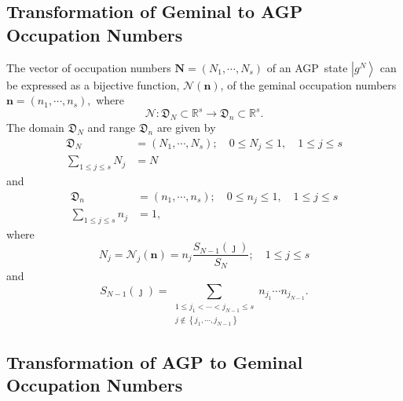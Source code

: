 \documentclass[aps,preprint]{revtex4}%
\begin{document}
\subsection{Transformation of Geminal to AGP Occupation Numbers}

The vector of occupation numbers $\mathbf{N}=\left(  N_{1},\cdots
,N_{s}\right)  $ of an AGP\ state $\left\vert g^{N}\right\rangle $ can be
expressed as a bijective function, $\mathcal{N}\left(  \mathbf{n}\right)  $,
of the geminal occupation numbers $\mathbf{n}=\left(  n_{1},\cdots
,n_{s}\right)  ,$ where
\begin{equation}
\mathcal{N}:\mathfrak{D}_{N}\subset\mathbb{R}^{s}\rightarrow\mathfrak{D}%
_{n}\subset\mathbb{R}^{s}.
\end{equation}
The domain $\mathfrak{D}_{N}$ and range $\mathfrak{D}_{n}$ are given by%
\begin{align}
\mathfrak{D}_{N}  &  =\left(  N_{1},\cdots,N_{s}\right)  ;\quad0\leq N_{j}%
\leq1,\quad1\leq j\leq s\nonumber\\
\sum_{1\leq j\leq s}N_{j}  &  =N
\end{align}
and
\begin{align}
\mathfrak{D}_{n}  &  =\left(  n_{1},\cdots,n_{s}\right)  ;\quad0\leq n_{j}%
\leq1,\quad1\leq j\leq s\nonumber\\
\sum_{1\leq j\leq s}n_{j}  &  =1,
\end{align}
where
\begin{equation}
N_{j}=\mathcal{N}_{j}\left(  \mathbf{n}\right)  =n_{j}\frac{S_{N-1}\left(
\jmath\right)  }{S_{N}};\quad1\leq j\leq s
\end{equation}
and
\begin{equation}
S_{N-1}\left(  \jmath\right)  =\sum_{\substack{1\leq j_{1}<\cdots<j_{N-1}\leq
s\\j\notin\left\{  j_{1},\cdots,j_{N-1}\right\}  }}n_{j_{1}}\cdots n_{j_{N-1}%
}.
\end{equation}


\subsection{Transformation of AGP to Geminal Occupation Numbers}
\end{document}
